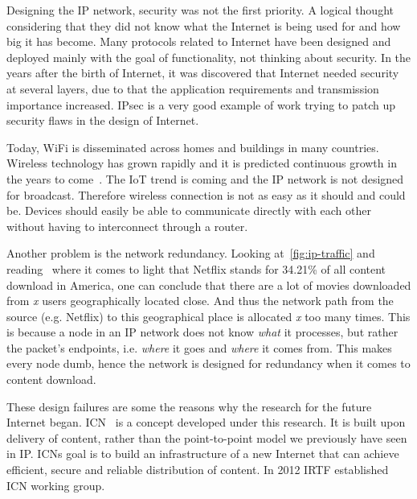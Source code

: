 Designing the \gls{IP} network, security was not the first priority.
A logical thought considering that they did not know what the Internet is being used for and how big it has become.
Many protocols related to Internet have been designed and deployed mainly with the goal of functionality, not thinking about security.
In the years after the birth of Internet, it was discovered that Internet needed security at several layers, due to that the application requirements and transmission importance increased.
\gls{IPsec} is a very good example of work trying to patch up security flaws in the design of Internet.

Today, WiFi is disseminated across homes and buildings in many countries. 
Wireless technology has grown rapidly and it is predicted continuous growth in the years to come~\cite{DBLP:journals/jthtl/Rosston14}. 
The \gls{IoT} trend is coming and the \gls{IP} network is not designed for broadcast.
Therefore wireless connection is not as easy as it should and could be.
Devices should easily be able to communicate directly with each other without having to interconnect through a router.

Another problem is the network redundancy. 
Looking at~\autoref{fig:ip-traffic} and reading~\cite{gipr2014} where it comes to light that Netflix stands for 34.21\% of all content download in America, one can conclude that there are a lot of movies downloaded from \textit{x} users geographically located close.
And thus the network path from the source (e.g. Netflix) to this geographical place is allocated \textit{x} too many times. 
This is because a node in an \gls{IP} network does not know \textit{what} it processes, but rather the packet's endpoints, i.e. \textit{where} it goes and \textit{where} it comes from. 
This makes every node dumb, hence the network is designed for redundancy when it comes to content download.

These design failures are some the reasons why the research for the future Internet began.  
\gls{ICN}~\cite{DBLP:journals/cm/AhlgrenDIKO12} is a concept developed under this research.
It is built upon delivery of content, rather than the point-to-point model we previously have seen in \gls{IP}.
\gls{ICN}s goal is to build an infrastructure of a new Internet that can achieve efficient, secure and reliable distribution of content.
In 2012 \gls{IRTF} established \gls{ICN} working group.


